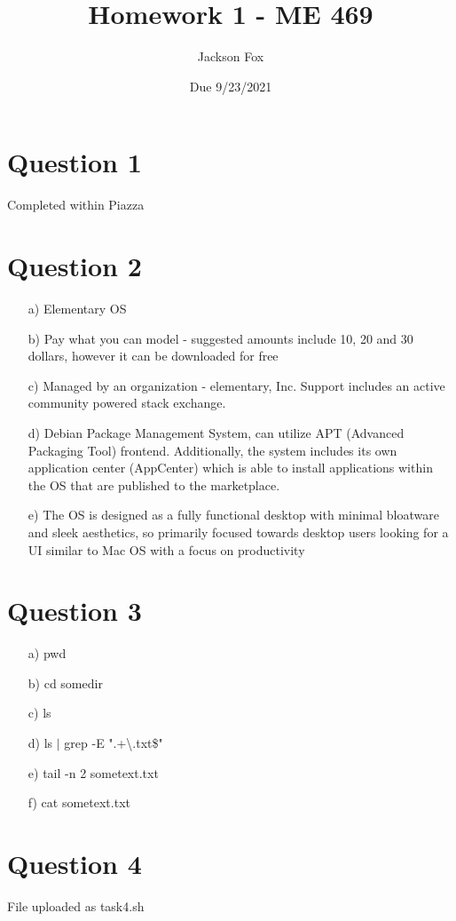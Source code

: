 \documentclass[11pt, oneside]{article}   	%
\title{Homework 1 - ME 469}
\author{Jackson Fox}
\date{Due 9/23/2021}							%
\begin{document}
\maketitle
\section*{Question 1}

Completed within Piazza

\section*{Question 2}
\begin{enumerate}
\item[a)] Elementary OS
\item[b)] Pay what you can model - suggested amounts include 10, 20 and 30 dollars, however it can be downloaded for free
\item[c)] Managed by an organization - elementary, Inc.  Support includes an active community powered stack exchange.
\item[d)] Debian Package Management System, can utilize APT (Advanced Packaging Tool) frontend.  Additionally, the system includes its own application center (AppCenter) which is able to install applications within the OS that are published to the marketplace.
\item[e)] The OS is designed as a fully functional desktop with minimal bloatware and sleek aesthetics, so primarily focused towards desktop users looking for a UI similar to Mac OS with a focus on productivity
 
\end{enumerate}

\section*{Question 3}
\begin{enumerate}
\item[a)]  pwd
\item[b)] cd somedir
\item[c)] ls
\item[d)] ls $|$ grep -E ".+\textbackslash.txt\$"
\item[e)] tail -n 2 sometext.txt
\item[f)] cat sometext.txt
\end{enumerate}

\section*{Question 4}
File uploaded as task4.sh
\end{document}
